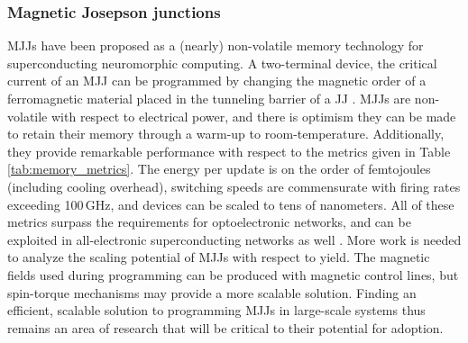 \documentclass[twocolumn]{article}
\begin{document}
\subsubsection{Magnetic Josepson junctions}
MJJs have been proposed as a (nearly) non-volatile memory technology for superconducting neuromorphic computing. A two-terminal device, the critical current of an MJJ can be programmed by changing the magnetic order of a ferromagnetic material placed in the tunneling barrier of a JJ \cite{schneider2018ultralow}. MJJs are non-volatile with respect to electrical power, and there is optimism they can be made to retain their memory through a warm-up to room-temperature. Additionally, they provide remarkable performance with respect to the metrics given in Table \ref{tab:memory_metrics}. The energy per update is on the order of femtojoules (including cooling overhead), switching speeds are commensurate with firing rates exceeding 100\,GHz, and devices can be scaled to tens of nanometers. All of these metrics surpass the requirements for optoelectronic networks, and can be exploited in all-electronic superconducting networks as well \cite{schneider2018tutorial}. More work is needed to analyze the scaling potential of MJJs with respect to yield. The magnetic fields used during programming can be produced with magnetic control lines, but spin-torque mechanisms may provide a more scalable solution. Finding an efficient, scalable solution to programming MJJs in large-scale systems thus remains an area of research that will be critical to their potential for adoption.
\end{document}

